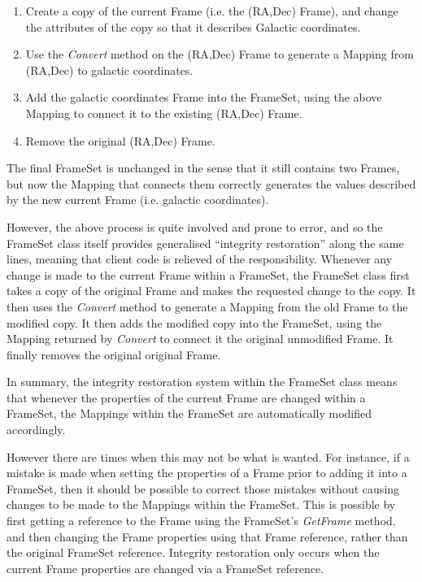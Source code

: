 \documentclass[final,authoryear,5p,times,twocolumn]{elsarticle}
\begin{document}
\begin{enumerate}
\item Create a copy of the current Frame (i.e. the (RA,Dec) Frame), and
change the attributes of the copy so that it describes Galactic
coordinates.
\item Use the \emph{Convert} method on the (RA,Dec) Frame to generate a
Mapping from (RA,Dec) to galactic coordinates.
\item Add the galactic coordinates Frame into the FrameSet, using the
above Mapping to connect it to the existing (RA,Dec) Frame.
\item Remove the original (RA,Dec) Frame.
\end{enumerate}

The final FrameSet is unchanged in the sense that it still contains two
Frames, but now the Mapping that connects them correctly generates the values
described by the new current Frame (i.e. galactic coordinates).

However, the above process is quite involved and prone to error, and so
the FrameSet class itself provides generalised ``integrity restoration''
along the same lines, meaning that client code is relieved of the
responsibility. Whenever any change is made to the current Frame within a
FrameSet, the FrameSet class first takes a copy of the original Frame and
makes the requested change to the copy. It then uses the \emph{Convert}
method to generate a Mapping from the old Frame to the modified copy. It
then adds the modified copy into the FrameSet, using the Mapping returned
by \emph{Convert} to connect it the original unmodified Frame. It finally
removes the original original Frame.

In summary, the integrity restoration system within the FrameSet class
means that whenever the properties of the current Frame are changed within a
FrameSet, the Mappings within the FrameSet are automatically modified
accordingly.

However there are times when this may not be what is wanted. For
instance, if a mistake is made when setting the properties of a Frame
prior to adding it into a FrameSet, then it should be possible to correct
those mistakes without causing changes to be made to the Mappings within
the FrameSet. This is possible by first getting a reference to the Frame
using the FrameSet's \emph{GetFrame} method, and then changing the Frame
properties using that Frame reference, rather than the original FrameSet
reference. Integrity restoration only occurs when the current Frame properties
are changed via a FrameSet reference.
\end{document}
